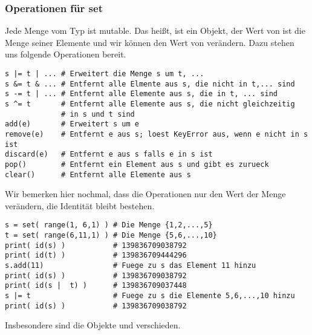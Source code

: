 \subsubsection{Operationen für set}
\label{section:std_data_types:mengen:operationen_fuer_set}
Jede Menge  vom Typ  ist mutable.
Das heißt,  ist ein Objekt, der Wert von  ist die Menge seiner Elemente und wir können den Wert von  verändern.
Dazu stehen uns folgende Operationen bereit.
\begin{lstlisting}
s |= t | ... # Erweitert die Menge s um t, ...
s &= t & ... # Entfernt alle Elmente aus s, die nicht in t,... sind
s -= t | ... # Entfernt alle Elemente aus s, die in t, ... sind
s ^= t       # Entfernt alle Elemente aus s, die nicht gleichzeitig
             # in s und t sind
add(e)       # Erweitert s um e
remove(e)    # Entfernt e aus s; loest KeyError aus, wenn e nicht in s ist
discard(e)   # Entfernt e aus s falls e in s ist
pop()        # Entfernt ein Element aus s und gibt es zurueck
clear()      # Entfernt alle Elemente aus s
\end{lstlisting}

Wir bemerken hier nochmal, dass die Operationen nur den Wert der Menge  verändern, die Identität  bleibt bestehen.
\begin{lstlisting}
s = set( range(1, 6,1) ) # Die Menge {1,2,...,5}
t = set( range(6,11,1) ) # Die Menge {5,6,...,10}
print( id(s) )           # 139836709038792
print( id(t) )           # 139836709444296
s.add(11)                # Fuege zu s das Element 11 hinzu
print( id(s) )           # 139836709038792
print( id(s |  t) )      # 139836709037448
s |= t                   # Fuege zu s die Elemente 5,6,...,10 hinzu
print( id(s) )           # 139836709038792
\end{lstlisting}
Insbesondere sind die Objekte  und  verschieden.
